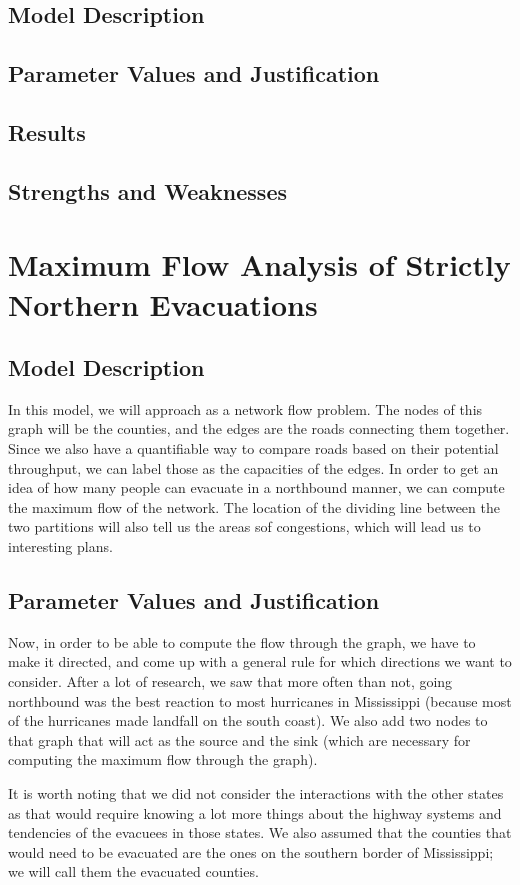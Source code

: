 \documentclass[titlepage]{article}
\begin{document}
  \subsection{Model Description}
  \subsection{Parameter Values and Justification}
  \subsection{Results}
  \subsection{Strengths and Weaknesses}

\section{Maximum Flow Analysis of Strictly Northern Evacuations}
\label{sec:maxflow}
  \subsection{Model Description}
    \par In this model, we will approach as a network flow problem. The nodes of this graph will be the counties, and the edges are the roads connecting them together. Since we also have a quantifiable way to compare roads based on their potential throughput, we can label those as the capacities of the edges. 
    In order to get an idea of how many people can evacuate in a northbound manner, we can compute the maximum flow of the network. The location of the dividing line between the two partitions will also tell us the areas sof congestions, which will lead us to interesting plans.
  \subsection{Parameter Values and Justification}
    \par Now, in order to be able to compute the flow through the graph, we have to make it directed, and come up with a general rule for which directions we want to consider. After a lot of research, we saw that more often than not, going northbound was the best reaction to most hurricanes in Mississippi (because most of the hurricanes made landfall on the south coast). 
    We also add two nodes to that graph that will act as the source and the sink (which are necessary for computing the maximum flow through the graph).
    \par It is worth noting that we did not consider the interactions with the other states as that would require knowing a lot more things about the highway systems and tendencies of the evacuees in those states. We also assumed that the counties that would need to be evacuated are the ones on the southern border of Mississippi; we will call them the evacuated counties.
\end{document}
